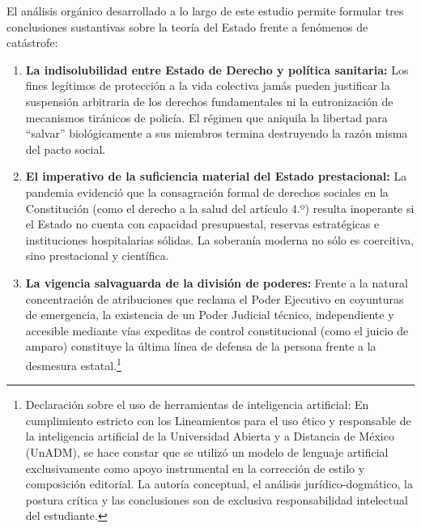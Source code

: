 \documentclass[12pt,spanish,letterpaper,oneside]{article}
\begin{document}
El an\'alisis org\'anico desarrollado a lo largo de este estudio permite formular tres conclusiones sustantivas sobre la teor\'ia del Estado frente a fen\'omenos de cat\'astrofe:

\begin{enumerate}
  \item \textbf{La indisolubilidad entre Estado de Derecho y pol\'itica sanitaria:} Los fines leg\'itimos de protecci\'on a la vida colectiva jam\'as pueden justificar la suspensi\'on arbitraria de los derechos fundamentales ni la entronizaci\'on de mecanismos tir\'anicos de polic\'ia. El r\'egimen que aniquila la libertad para ``salvar'' biol\'ogicamente a sus miembros termina destruyendo la raz\'on misma del pacto social.
  \item \textbf{El imperativo de la suficiencia material del Estado prestacional:} La pandemia evidenci\'o que la consagraci\'on formal de derechos sociales en la Constituci\'on (como el derecho a la salud del art\'iculo 4.º) resulta inoperante si el Estado no cuenta con capacidad presupuestal, reservas estrat\'egicas e instituciones hospitalarias s\'olidas. La soberan\'ia moderna no s\'olo es coercitiva, sino prestacional y cient\'ifica.
  \item \textbf{La vigencia salvaguarda de la divisi\'on de poderes:} Frente a la natural concentraci\'on de atribuciones que reclama el Poder Ejecutivo en coyunturas de emergencia, la existencia de un Poder Judicial t\'ecnico, independiente y accesible mediante v\'ias expeditas de control constitucional (como el juicio de amparo) constituye la \'ultima l\'inea de defensa de la persona frente a la desmesura estatal.\footnote{Declaraci\'on sobre el uso de herramientas de inteligencia artificial: En cumplimiento estricto con los Lineamientos para el uso \'etico y responsable de la inteligencia artificial de la Universidad Abierta y a Distancia de M\'exico (UnADM), se hace constar que se utiliz\'o un modelo de lenguaje artificial exclusivamente como apoyo instrumental en la correcci\'on de estilo y composici\'on editorial. La autor\'ia conceptual, el an\'alisis jur\'idico-dogm\'atico, la postura cr\'itica y las conclusiones son de exclusiva responsabilidad intelectual del estudiante.}
\end{enumerate}
\end{document}

